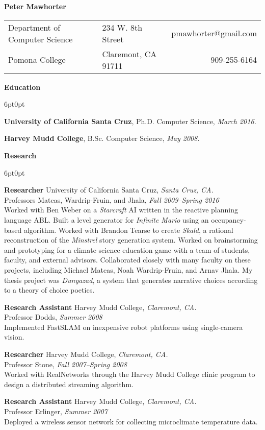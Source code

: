 \documentclass[11pt]{article}
\newenvironment{sct}[1]{%
  \vspace{8pt}\textbf{\Large #1} \hrulefill\vspace{6pt}
  \begin{adjustwidth}{6pt}{0pt}
}{%
  \end{adjustwidth}
}
\newcommand{\work}[1]{\textit{#1}\xspace}
\newcommand{\edu}[3]{\textbf{#1}, #2, \textit{#3.}}
\newcommand{\experience}[6]{%
  \textbf{#1} #2, \textit{#3.} \\
  #4, \textit{#5} \vspace{6pt} \\
  #6 \vspace{8pt}
}
\begin{document}
\textbf{\huge Peter Mawhorter }\hrulefill\vspace{6pt}

\begin{tabularx}{\textwidth}{X X r}
Department of Computer Science & 234 W. 8th Street & pmawhorter@gmail.com \\
Pomona College & Claremont, CA 91711 & 909-255-6164 \\
\end{tabularx}

\begin{sct}{Education}

\edu{University of California Santa Cruz}{Ph.D. Computer Science}{March 2016}

\edu{Harvey Mudd College}{B.Sc. Computer Science}{May 2008}

\end{sct}

\begin{sct}{Research}

\experience{Researcher}{University of California Santa Cruz}{Santa Cruz, CA}%
{Professors Mateas, Wardrip-Fruin, and Jhala}{Fall 2009--Spring 2016}{
Worked with Ben Weber on a \work{Starcraft} AI written in the reactive planning
language ABL. Built a level generator for \work{Infinite Mario} using an
occupancy-based algorithm. Worked with Brandon Tearse to create \work{Skald}, a
rational reconstruction of the \work{Minstrel} story generation system. Worked
on brainstorming and prototyping for a climate science education game with a
team of students, faculty, and external advisors. Collaborated closely with
many faculty on these projects, including Michael Mateas, Noah Wardrip-Fruin,
and Arnav Jhala. My thesis project was \work{Dunyazad}, a system that generates
narrative choices according to a theory of choice poetics.
}

\experience{Research Assistant}{Harvey Mudd College}{Claremont, CA}%
{Professor Dodds}{Summer 2008}{
Implemented FastSLAM on inexpensive robot platforms using single-camera vision.
}

\experience{Researcher}{Harvey Mudd College}{Claremont, CA}%
{Professor Stone}{Fall 2007--Spring 2008}{
Worked with RealNetworks through the Harvey Mudd College clinic program to
design a distributed streaming algorithm.
}

\experience{Research Assistant}{Harvey Mudd College}{Claremont, CA}%
{Professor Erlinger}{Summer 2007}{
Deployed a wireless sensor network for collecting microclimate temperature data.
}

\end{sct}
\end{document}

